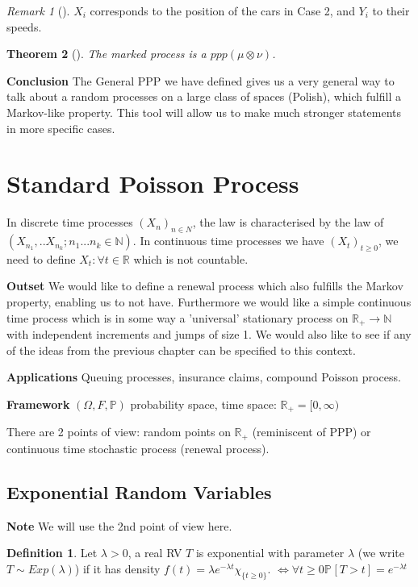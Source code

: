 \documentclass[12pt]{book}
\renewcommand{\iff}{\Leftrightarrow}
\newtheorem{theorem}{Theorem}[section]
\theoremstyle{definition}
\newtheorem{defn}{Definition}[section]
\theoremstyle{remark}
\newtheorem{rmk}[theorem]{Remark}
\begin{document}
\begin{rmk}[]
	$X_i$ corresponds to the position of the cars in Case 2, and $Y_i$ to their speeds.
\end{rmk}

\begin{theorem}[]
	The marked process is a $ppp(\mu \otimes \nu )$.
\end{theorem}

\noindent \textbf{Conclusion} The General PPP we have defined gives us a very general way to talk about a random processes on a large class of spaces (Polish), which fulfill a Markov-like property. This tool will allow us to make much stronger statements in more specific cases.

\section{Standard Poisson Process}
In discrete time processes $(X_n)_{n\in N}$, the law is characterised by the law of $(X_{n_1},..X_{n_k}; n_1...n_k \in \mathbb{N})$. In continuous time processes we have $(X_t)_{t\geq 0}$, we need to define $X_t:\forall t \in \mathbb{R}$ which is not countable.

\noindent \textbf{Outset} We would like to define a renewal process which also fulfills the Markov property, enabling us to not have. Furthermore we would like a simple continuous time process which is in some way a 'universal' stationary process on $\mathbb{R}_+ \to \mathbb{N}$ with independent increments and jumps of size 1. We would also like to see if any of the ideas from the previous chapter can be specified to this context.

\textbf{Applications} Queuing processes, insurance claims, compound Poisson process.

\textbf{Framework} $(\Omega, F, \mathbb{P})$ probability space, time space: $\mathbb{R}_{+}=[0,\infty)$ 

There are 2 points of view: random points on $\mathbb{R}_{+}$ (reminiscent of PPP) or continuous time stochastic process (renewal process).

\subsection{Exponential Random Variables}
\textbf{Note} We will use the 2nd point of view here.

\begin{defn}
	Let $\lambda> 0$, a real RV $T$ is exponential with parameter $\lambda$ (we write $T \sim Exp(\lambda)$) if it has density $f(t) = \lambda e ^{-\lambda t}\chi_{\{t\geq 0\}}$. $\iff \forall t\geq 0 \mathbb{P}_{} \left[ T>t \right] = e^{-\lambda t}$
\end{defn}
\end{document}
